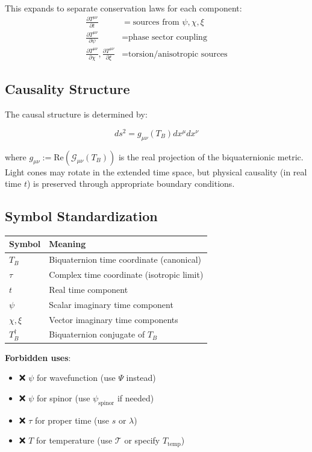 This expands to separate conservation laws for each component:
\begin{align}
\frac{\partial T^{\mu\nu}}{\partial t} &= \text{sources from } \psi, \chi, \xi \\
\frac{\partial T^{\mu\nu}}{\partial \psi} &= \text{phase sector coupling} \\
\frac{\partial T^{\mu\nu}}{\partial \chi}, \frac{\partial T^{\mu\nu}}{\partial \xi} &= \text{torsion/anisotropic sources}
\end{align}

\subsection{Causality Structure}

The causal structure is determined by:

\begin{equation}
\label{eq:canonical:causality}
ds^2 = g_{\mu\nu}(T_B) dx^\mu dx^\nu
\end{equation}

where $g_{\mu\nu} := \text{Re}(\mathcal{G}_{\mu\nu}(T_B))$ is the real projection of the biquaternionic metric. Light cones may rotate in the extended time space, but physical causality (in real time $t$) is preserved through appropriate boundary conditions.

\subsection{Symbol Standardization}

\begin{tabular}{ll}
\textbf{Symbol} & \textbf{Meaning} \\
\hline
$T_B$ & Biquaternion time coordinate (canonical) \\
$\tau$ & Complex time coordinate (isotropic limit) \\
$t$ & Real time component \\
$\psi$ & Scalar imaginary time component \\
$\chi, \xi$ & Vector imaginary time components \\
$T_B^\dagger$ & Biquaternion conjugate of $T_B$ \\
\end{tabular}

\vspace{1em}

\textbf{Forbidden uses}:
\begin{itemize}
    \item ❌ $\psi$ for wavefunction (use $\Psi$ instead)
    \item ❌ $\psi$ for spinor (use $\psi_\text{spinor}$ if needed)
    \item ❌ $\tau$ for proper time (use $s$ or $\lambda$)
    \item ❌ $T$ for temperature (use $\mathcal{T}$ or specify $T_{\text{temp}}$)
\end{itemize}

